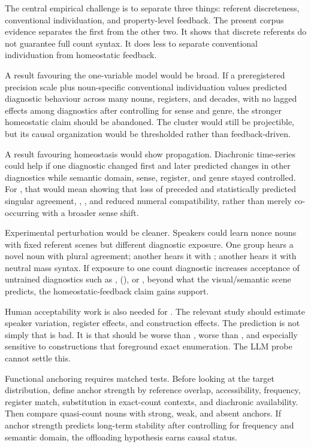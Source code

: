 \documentclass[12pt,a4paper]{article}
\begin{document}
The central empirical challenge is to separate three things: referent discreteness, conventional individuation, and property-level feedback. The present corpus evidence separates the first from the other two. It shows that discrete referents do not guarantee full count syntax. It does less to separate conventional individuation from homeostatic feedback.

A result favouring the one-variable model would be broad. If a preregistered precision scale plus noun-specific conventional individuation values predicted diagnostic behaviour across many nouns, registers, and decades, with no lagged effects among diagnostics after controlling for sense and genre, the stronger homeostatic claim should be abandoned. The cluster would still be projectible, but its causal organization would be thresholded rather than feedback-driven.

A result favouring homeostasis would show propagation. Diachronic time-series could help if one diagnostic changed first and later predicted changes in other diagnostics while semantic domain, sense, register, and genre stayed controlled. For , that would mean showing that loss of  preceded and statistically predicted singular agreement, , , and reduced numeral compatibility, rather than merely co-occurring with a broader sense shift.

Experimental perturbation would be cleaner. Speakers could learn nonce nouns with fixed referent scenes but different diagnostic exposure. One group hears a novel noun with plural agreement; another hears it with ; another hears it with neutral mass syntax. If exposure to one count diagnostic increases acceptance of untrained diagnostics such as , (), or , beyond what the visual/semantic scene predicts, the homeostatic-feedback claim gains support.

Human acceptability work is also needed for . The relevant study should estimate speaker variation, register effects, and construction effects. The prediction is not simply that  is bad. It is that  should be worse than , worse than , and especially sensitive to constructions that foreground exact enumeration. The LLM probe cannot settle this.

Functional anchoring requires matched tests. Before looking at the target distribution, define anchor strength by reference overlap, accessibility, frequency, register match, substitution in exact-count contexts, and diachronic availability. Then compare quasi-count nouns with strong, weak, and absent anchors. If anchor strength predicts long-term stability after controlling for frequency and semantic domain, the offloading hypothesis earns causal status.
\end{document}
